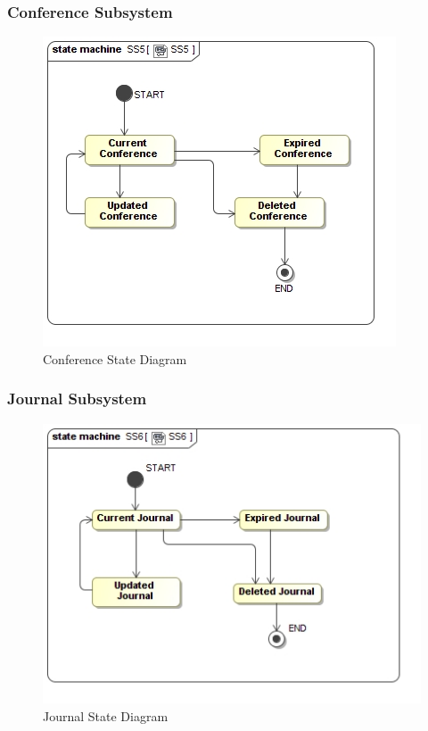 \documentclass{article}
\begin{document}
			\subsubsection{Conference Subsystem}
				\begin{figure}
					\includegraphics[width=\textwidth]{5.4-SS5-7/SS5}
					\caption{Conference State Diagram}
				\end{figure}
			\subsubsection{Journal Subsystem}
				\begin{figure}
					\includegraphics[width=\textwidth]{5.4-SS5-7/SS6}
					\caption{Journal State Diagram}
				\end{figure}
\end{document}
